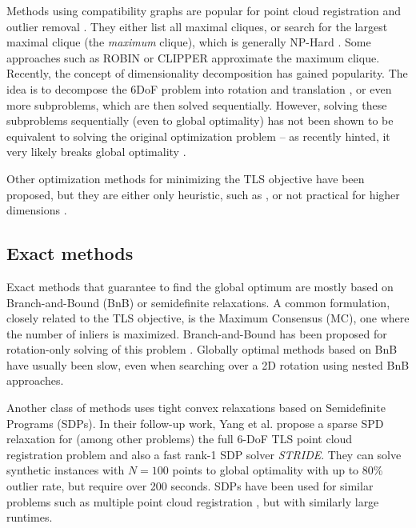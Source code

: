 Methods using compatibility graphs are popular for point cloud registration \cite{Yang20tro-teaser, SC2-PCR-Chen-2022-CVPR, 10161215, lim2024kissmatcherfastrobustpoint} and outlier removal \cite{7410607, 10091912, zhang20233d}. They either list all maximal cliques, or search for the largest maximal clique (the \textit{maximum} clique), which is generally NP-Hard \cite[p.15]{approx-algo-book-shmoys-et-al}. Some approaches such as ROBIN \cite{9562007} or CLIPPER \cite{10432947} approximate the maximum clique.
Recently, the concept of dimensionality decomposition has gained popularity. The idea is to decompose the 6DoF problem into rotation and translation \cite{Yang2020OneRT, 9485090}, or even more \cite{9878458, 10656079} subproblems, which are then solved sequentially.
However, solving these subproblems sequentially (even to global optimality) has not been shown to be equivalent to solving the original optimization problem -- as recently hinted, it very likely breaks global optimality \cite{9878458}.

Other optimization methods for minimizing the TLS objective have been proposed, but they are either only heuristic, such as \cite{Barratt2020}, or not practical for higher dimensions \cite{doi:10.1080/10618600.2017.1390471}.

\subsection{Exact methods}

Exact methods that guarantee to find the global optimum are mostly based on Branch-and-Bound (BnB) or semidefinite relaxations. A common formulation, closely related to the TLS objective, is the
Maximum Consensus (MC), one where the number of inliers is maximized. Branch-and-Bound has been proposed for rotation-only solving of this problem \cite{4408896, 10.1007/978-3-642-37444-9_42}. Globally optimal methods based on BnB have usually been slow, even when searching over a 2D rotation \cite{9447984} using nested BnB approaches.

Another class of methods uses tight convex relaxations based on Semidefinite Programs (SDPs). In their follow-up work, Yang et al. \cite{9785843} propose a sparse SPD relaxation for (among other problems) the full 6-DoF TLS point cloud registration problem and also a fast rank-1 SDP solver \textit{STRIDE}. They can solve synthetic instances with $N=100$ points to global optimality with up to 80\% outlier rate, but require over 200 seconds. SDPs have been used for similar problems such as multiple point cloud registration \cite{9157383}, but with similarly large runtimes.




